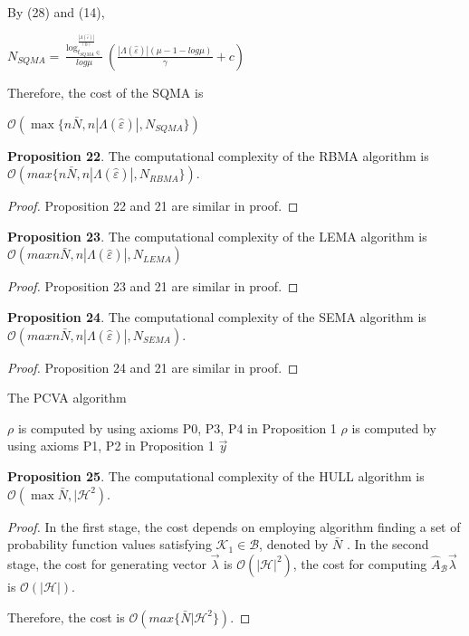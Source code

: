 \documentclass[]{iosart2c}
\begin{document}
  By (28) and (14),

  $N_{SQMA} =  \frac{ \log^{\frac{|\Lambda(\hat{\varepsilon})|}{(0)}}_{t_{SQMA} \in}}{log\mu}  \left( \frac{|\Lambda(\hat{\varepsilon})| (\mu - 1 - log\mu)}{\gamma} + c \right)$

  Therefore, the cost of the SQMA is

  $\mathcal{O}(\max\{n \bar N, n |\Lambda(\hat{\varepsilon})|,N_{SQMA}\})$

  \textbf{Proposition 22}. The computational complexity of the RBMA algorithm is $\mathcal{O}(max\{n \bar N, n |\Lambda(\hat{\varepsilon})|,N_{RBMA}\})$.

  \begin{proof}
    Proposition 22 and 21 are similar in proof.
  \end{proof}

  \textbf{Proposition 23}. The computational complexity of the LEMA algorithm is $\mathcal{O}(max{n \bar N, n |\Lambda(\hat{\varepsilon})|,N_{LEMA}})$

  \begin{proof}
    Proposition 23 and 21 are similar in proof.
  \end{proof}

  \textbf{Proposition 24}. The computational complexity of the
  SEMA algorithm is $\mathcal{O}(max{n \bar N, n |\Lambda(\hat{\varepsilon})|,N_{SEMA}})$.

  \begin{proof}
    Proposition 24 and 21 are similar in proof.
  \end{proof}

  \begin{algorithm}
    \caption{The PCVA algorithm}
    \begin{algorithmic}[1]
        \State $\rho$ is computed by using axioms P0, P3, P4 in Proposition 1
      \EndFor
        \State $\rho$ is computed by using axioms P1, P2 in Proposition 1
      \EndFor
      \State \Return $\vec{y}$
    \end{algorithmic}
  \end{algorithm}

  \textbf{Proposition 25}. The computational complexity of the
  HULL algorithm is $\mathcal{O}(\max{\bar N, |\mathcal{H}^2})$.

  \begin{proof}
    In the first stage, the cost depends on employing algorithm finding a set of probability function
    values satisfying $\mathcal{K}_1 \in \mathcal{B}$, denoted by $\bar N$ . In the
    second stage, the cost for generating vector $\vec{\lambda}$ is
    $\mathcal{O}(|\mathcal{H}|^2)$, the cost for computing $\hat{A}_\mathcal{B}\vec{\lambda}$ is $\mathcal{O}(|\mathcal{H}|)$.

    Therefore, the cost is $\mathcal{O}(max\{\bar N|\mathcal{H}^2\})$.
  \end{proof}
\end{document}
